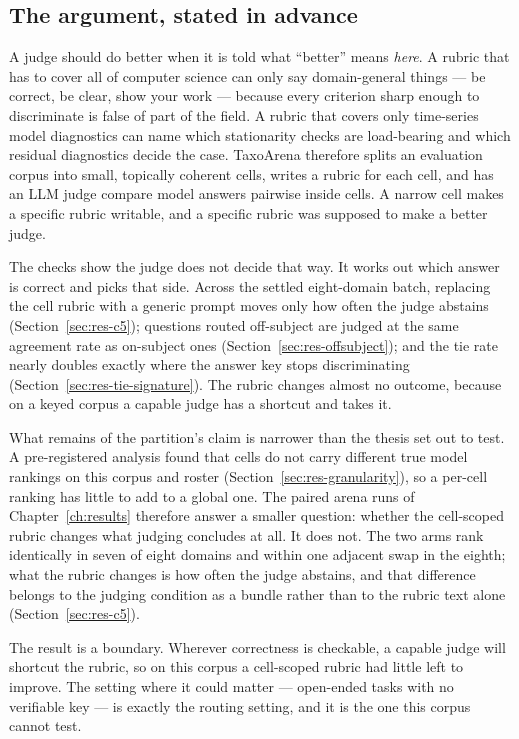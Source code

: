 \subsection*{The argument, stated in advance}

A judge should do better when it is told what ``better'' means
\emph{here}. A rubric that has to cover all of computer science can
only say domain-general things --- be correct, be clear, show your work
--- because every criterion sharp enough to discriminate is false of
part of the field. A rubric that covers only time-series model
diagnostics can name which stationarity checks are load-bearing and
which residual diagnostics decide the case. TaxoArena therefore splits
an evaluation corpus into small, topically coherent cells, writes a
rubric for each cell, and has an LLM judge compare model answers
pairwise inside cells. A narrow cell makes a specific rubric writable,
and a specific rubric was supposed to make a better judge.

The checks show the judge does not decide that way. It works out which
answer is correct and picks that side. Across the settled eight-domain
batch, replacing the cell rubric with a generic prompt moves only how
often the judge abstains
(Section~\ref{sec:res-c5}); questions routed off-subject are judged at
the same agreement rate as on-subject ones
(Section~\ref{sec:res-offsubject}); and the tie rate nearly doubles
exactly where the answer key stops discriminating
(Section~\ref{sec:res-tie-signature}). The rubric changes almost no
outcome, because on a keyed corpus a capable judge has a shortcut and
takes it.

What remains of the partition's claim is narrower than the thesis set
out to test. A pre-registered analysis found that cells do not carry
different true model rankings on this corpus and roster
(Section~\ref{sec:res-granularity}), so a per-cell ranking has little
to add to a global one. The paired arena runs of
Chapter~\ref{ch:results} therefore answer a smaller question: whether
the cell-scoped rubric changes what judging concludes at all. It does
not. The two arms rank identically in seven of eight domains and
within one adjacent swap in the eighth; what the rubric changes is how
often the judge abstains, and that difference belongs to the judging
condition as a bundle rather than to the rubric text alone
(Section~\ref{sec:res-c5}).

The result is a boundary. Wherever correctness is checkable, a capable
judge will shortcut the rubric, so on this corpus a cell-scoped rubric
had little left to improve. The setting where it could matter ---
open-ended tasks with no verifiable key --- is exactly the routing
setting, and it is the one this corpus cannot test.

